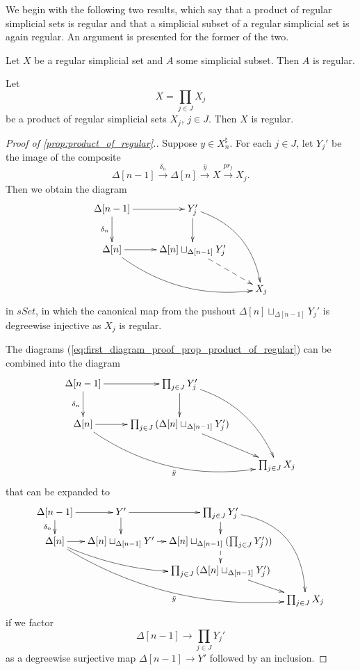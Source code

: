 We begin with the following two results, which say that a product of regular simplicial sets is regular and that a simplicial subset of a regular simplicial set is again regular. An argument is presented for the former of the two.
\begin{lemma}\label{lem:simplicial_subset_of_regular}
Let $X$ be a regular simplicial set and $A$ some simplicial subset. Then $A$ is regular.
\end{lemma}
\begin{proposition}\label{prop:product_of_regular}
Let
\[X=\prod _{j\in J}{X_j}\]
be a product of regular simplicial sets $X_j$, $j\in J$. Then $X$ is regular.
\end{proposition}
\begin{proof}[Proof of \cref{prop:product_of_regular}.]
Suppose $y\in X_n^\sharp$. For each $j\in J$, let $Y_j'$ be the image of the composite
\[\Delta [n-1]\xrightarrow{\delta _n} \Delta [n]\xrightarrow{\bar{y} } X\xrightarrow{pr_j} X_j.\]
Then we obtain the diagram
\begin{equation}
\label{eq:first_diagram_proof_prop_product_of_regular}
\begin{gathered}
\xymatrix{
\Delta [n-1] \ar[d]_{\delta _n} \ar[r] & Y_j' \ar[d] \ar@/^1.5pc/[ddr] \\
\Delta [n] \ar[r] \ar@/_1.5pc/[drr] & \Delta [n]\sqcup _{\Delta [n-1]}Y_j' \ar@{-->}[dr] \\
&& X_j
}
\end{gathered}
\end{equation}
in $sSet$, in which the canonical map from the pushout $\Delta [n]\sqcup _{\Delta [n-1]}Y_j'$ is degreewise injective as $X_j$ is regular.

The diagrams (\ref{eq:first_diagram_proof_prop_product_of_regular}) can be combined into the diagram
\begin{displaymath}
\xymatrix{
\Delta [n-1] \ar[d]_{\delta _n} \ar[r] & \prod _{j\in J}{Y_j'} \ar[d] \ar@/^1.5pc/[ddr] \\
\Delta [n] \ar[r] \ar@/_2pc/[drr]_{\bar{y} } & \prod _{j\in J}{(\Delta [n]\sqcup _{\Delta [n-1]}Y_j')} \ar[dr] \\
&& \prod _{j\in J}{X_j}
}
\end{displaymath}
that can be expanded to
\begin{equation}
\label{eq:second_diagram_proof_prop_product_of_regular}
\begin{gathered}
\xymatrix@C=0.9em@R=1.2em{
\Delta [n-1] \ar[d]_{\delta _n} \ar[r] & Y' \ar[d] \ar[r] & \prod _{j\in J}{Y_j'} \ar[d] \ar@/^2.5pc/[dddr]  \\
\Delta [n] \ar[r] \ar@/_2pc/[ddrrr]_{\bar{y} } \ar@/_1pc/[drr] & \Delta [n]\sqcup _{\Delta [n-1]}Y' \ar@{-->}[r] & \Delta [n]\sqcup _{\Delta [n-1]}(\prod _{j\in J}{Y_j')}) \ar@{-->}[d] \\
&& \prod _{j\in J}{(\Delta [n]\sqcup _{\Delta [n-1]}Y_j')} \ar[dr] \\
&&& \prod _{j\in J}{X_j}
}
\end{gathered}
\end{equation}
if we factor
\[\Delta [n-1]\to \prod _{j\in J}{Y_j'}\]
as a degreewise surjective map $\Delta [n-1]\to Y'$ followed by an inclusion.


\end{proof}
